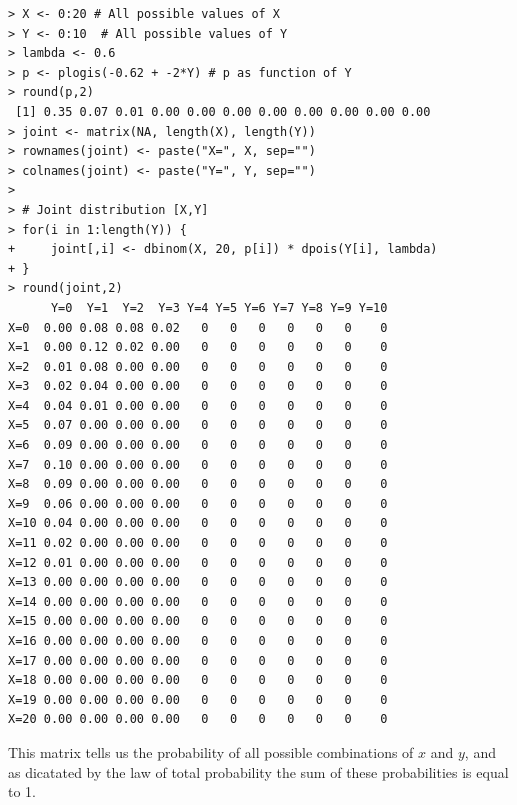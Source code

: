 \begin{verbatim}
> X <- 0:20 # All possible values of X
> Y <- 0:10  # All possible values of Y
> lambda <- 0.6
> p <- plogis(-0.62 + -2*Y) # p as function of Y
> round(p,2)
 [1] 0.35 0.07 0.01 0.00 0.00 0.00 0.00 0.00 0.00 0.00 0.00
> joint <- matrix(NA, length(X), length(Y))
> rownames(joint) <- paste("X=", X, sep="")
> colnames(joint) <- paste("Y=", Y, sep="")
>
> # Joint distribution [X,Y]
> for(i in 1:length(Y)) {
+     joint[,i] <- dbinom(X, 20, p[i]) * dpois(Y[i], lambda)
+ }
> round(joint,2)
      Y=0  Y=1  Y=2  Y=3 Y=4 Y=5 Y=6 Y=7 Y=8 Y=9 Y=10
X=0  0.00 0.08 0.08 0.02   0   0   0   0   0   0    0
X=1  0.00 0.12 0.02 0.00   0   0   0   0   0   0    0
X=2  0.01 0.08 0.00 0.00   0   0   0   0   0   0    0
X=3  0.02 0.04 0.00 0.00   0   0   0   0   0   0    0
X=4  0.04 0.01 0.00 0.00   0   0   0   0   0   0    0
X=5  0.07 0.00 0.00 0.00   0   0   0   0   0   0    0
X=6  0.09 0.00 0.00 0.00   0   0   0   0   0   0    0
X=7  0.10 0.00 0.00 0.00   0   0   0   0   0   0    0
X=8  0.09 0.00 0.00 0.00   0   0   0   0   0   0    0
X=9  0.06 0.00 0.00 0.00   0   0   0   0   0   0    0
X=10 0.04 0.00 0.00 0.00   0   0   0   0   0   0    0
X=11 0.02 0.00 0.00 0.00   0   0   0   0   0   0    0
X=12 0.01 0.00 0.00 0.00   0   0   0   0   0   0    0
X=13 0.00 0.00 0.00 0.00   0   0   0   0   0   0    0
X=14 0.00 0.00 0.00 0.00   0   0   0   0   0   0    0
X=15 0.00 0.00 0.00 0.00   0   0   0   0   0   0    0
X=16 0.00 0.00 0.00 0.00   0   0   0   0   0   0    0
X=17 0.00 0.00 0.00 0.00   0   0   0   0   0   0    0
X=18 0.00 0.00 0.00 0.00   0   0   0   0   0   0    0
X=19 0.00 0.00 0.00 0.00   0   0   0   0   0   0    0
X=20 0.00 0.00 0.00 0.00   0   0   0   0   0   0    0
\end{verbatim}
This matrix tells us the probability of all possible combinations of
$x$ and $y$, and as dicatated by the law of total probability the sum
of these probabilities is equal to 1.

